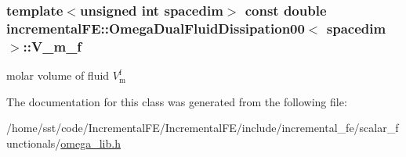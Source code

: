\subsubsection[{\texorpdfstring{V\+\_\+m\+\_\+f}{V_m_f}}]{\setlength{\rightskip}{0pt plus 5cm}template$<$unsigned int spacedim$>$ const double {\bf incremental\+F\+E\+::\+Omega\+Dual\+Fluid\+Dissipation00}$<$ spacedim $>$\+::V\+\_\+m\+\_\+f\hspace{0.3cm}{\ttfamily [private]}}\hypertarget{classincremental_f_e_1_1_omega_dual_fluid_dissipation00_a638e5773adb265e3b39702fde3936188}{}\label{classincremental_f_e_1_1_omega_dual_fluid_dissipation00_a638e5773adb265e3b39702fde3936188}
molar volume of fluid $V^\mathrm{f}_\mathrm{m}$ 

The documentation for this class was generated from the following file\+:\begin{DoxyCompactItemize}
\item 
/home/sst/code/\+Incremental\+F\+E/\+Incremental\+F\+E/include/incremental\+\_\+fe/scalar\+\_\+functionals/\hyperlink{omega__lib_8h}{omega\+\_\+lib.\+h}\end{DoxyCompactItemize}
